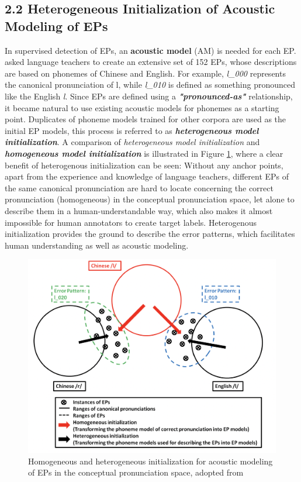 \documentclass[nobib]{tufte-handout}
\begin{document}
\subsection{2.2 \textbf{Heterogeneous Initialization of Acoustic Modeling of EPs}}

In supervised detection of EPs, an \textbf{acoustic model} (AM) is needed for each EP. \cite{wang2015supervised} asked language teachers to create an extensive set of 152 EPs, whose descriptions are based on phonemes of Chinese and English. For example, \textit{l\_000} represents the canonical pronunciation of l, while \textit{l\_010} is defined as something pronounced like the English \textit{l}. Since EPs are defined using a  \textbf{\textit{"pronounced-as"}} relationship, it became natural to use existing acoustic models for phonemes as a starting point. Duplicates of phoneme models trained for other corpora are used as the initial EP models, this process is referred to as \textbf{\textit{heterogeneous model initialization}}. A comparison of \textit{heterogeneous model initialization} and \textbf{\textit{homogeneous model initialization}} is illustrated in Figure \ref{fig:init}, where a clear benefit of heterogenous initialization can be seen: Without any anchor points, apart from the experience and knowledge of language teachers, different EPs of the same canonical pronunciation are hard to locate concerning the correct pronunciation (homogeneous) in the conceptual pronunciation space, let alone to describe them in a human-understandable way, which also makes it almost impossible for human annotators to create target labels. Heterogenous initialization provides the ground to describe the error patterns, which facilitates human understanding as well as acoustic modeling.

\begin{figure}
  \includegraphics{init.png}
  \caption{Homogeneous and heterogeneous initialization for acoustic modeling
of EPs in the conceptual pronunciation space, adopted from \cite{wang2015supervised}}
  \label{fig:init}
\end{figure}
\end{document}
